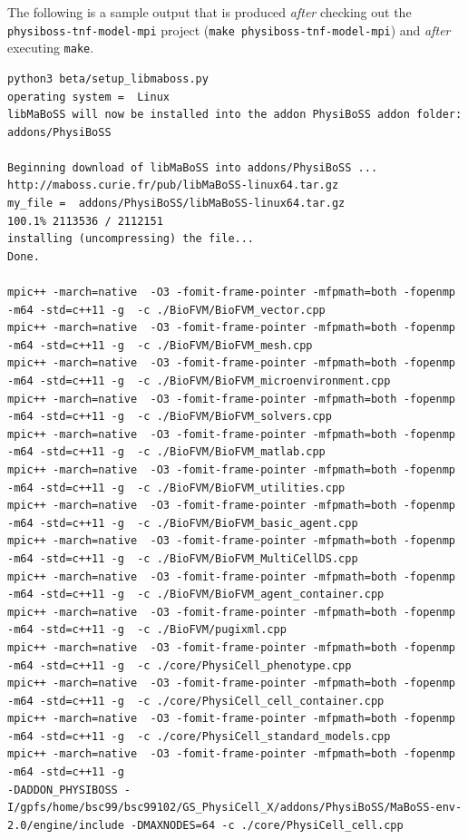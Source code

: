 \documentclass[12pt]{article}
\begin{document}
The following is a sample output that is produced \textit{after} checking out the \texttt{physiboss-tnf-model-mpi} project (\texttt{make physiboss-tnf-model-mpi}) and \textit{after} executing \texttt{make}. 

\begin{tiny}
\begin{verbatim}
python3 beta/setup_libmaboss.py
operating system =  Linux
libMaBoSS will now be installed into the addon PhysiBoSS addon folder:
addons/PhysiBoSS

Beginning download of libMaBoSS into addons/PhysiBoSS ...
http://maboss.curie.fr/pub/libMaBoSS-linux64.tar.gz
my_file =  addons/PhysiBoSS/libMaBoSS-linux64.tar.gz
100.1% 2113536 / 2112151
installing (uncompressing) the file...
Done.

mpic++ -march=native  -O3 -fomit-frame-pointer -mfpmath=both -fopenmp -m64 -std=c++11 -g  -c ./BioFVM/BioFVM_vector.cpp 
mpic++ -march=native  -O3 -fomit-frame-pointer -mfpmath=both -fopenmp -m64 -std=c++11 -g  -c ./BioFVM/BioFVM_mesh.cpp 
mpic++ -march=native  -O3 -fomit-frame-pointer -mfpmath=both -fopenmp -m64 -std=c++11 -g  -c ./BioFVM/BioFVM_microenvironment.cpp 
mpic++ -march=native  -O3 -fomit-frame-pointer -mfpmath=both -fopenmp -m64 -std=c++11 -g  -c ./BioFVM/BioFVM_solvers.cpp 
mpic++ -march=native  -O3 -fomit-frame-pointer -mfpmath=both -fopenmp -m64 -std=c++11 -g  -c ./BioFVM/BioFVM_matlab.cpp
mpic++ -march=native  -O3 -fomit-frame-pointer -mfpmath=both -fopenmp -m64 -std=c++11 -g  -c ./BioFVM/BioFVM_utilities.cpp 
mpic++ -march=native  -O3 -fomit-frame-pointer -mfpmath=both -fopenmp -m64 -std=c++11 -g  -c ./BioFVM/BioFVM_basic_agent.cpp 
mpic++ -march=native  -O3 -fomit-frame-pointer -mfpmath=both -fopenmp -m64 -std=c++11 -g  -c ./BioFVM/BioFVM_MultiCellDS.cpp
mpic++ -march=native  -O3 -fomit-frame-pointer -mfpmath=both -fopenmp -m64 -std=c++11 -g  -c ./BioFVM/BioFVM_agent_container.cpp 
mpic++ -march=native  -O3 -fomit-frame-pointer -mfpmath=both -fopenmp -m64 -std=c++11 -g  -c ./BioFVM/pugixml.cpp
mpic++ -march=native  -O3 -fomit-frame-pointer -mfpmath=both -fopenmp -m64 -std=c++11 -g  -c ./core/PhysiCell_phenotype.cpp
mpic++ -march=native  -O3 -fomit-frame-pointer -mfpmath=both -fopenmp -m64 -std=c++11 -g  -c ./core/PhysiCell_cell_container.cpp 
mpic++ -march=native  -O3 -fomit-frame-pointer -mfpmath=both -fopenmp -m64 -std=c++11 -g  -c ./core/PhysiCell_standard_models.cpp 
mpic++ -march=native  -O3 -fomit-frame-pointer -mfpmath=both -fopenmp -m64 -std=c++11 -g  
-DADDON_PHYSIBOSS -I/gpfs/home/bsc99/bsc99102/GS_PhysiCell_X/addons/PhysiBoSS/MaBoSS-env-2.0/engine/include -DMAXNODES=64 -c ./core/PhysiCell_cell.cpp

\end{verbatim}
\end{tiny}
\end{document}
